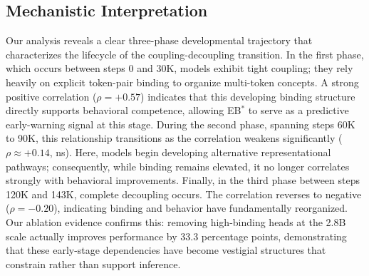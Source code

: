 \documentclass[10pt]{article} %
\begin{document}
\subsection{Mechanistic Interpretation}

Our analysis reveals a clear three-phase developmental trajectory that characterizes the lifecycle of the coupling-decoupling transition.
In the first phase, which occurs between steps 0 and 30K, models exhibit tight coupling; they rely heavily on explicit token-pair binding to organize multi-token concepts. A strong positive correlation ($\rho=+0.57$) indicates that this developing binding structure directly supports behavioral competence, allowing EB$^*$ to serve as a predictive early-warning signal at this stage.
During the second phase, spanning steps 60K to 90K, this relationship transitions as the correlation weakens significantly ($\rho\approx+0.14$, ns). Here, models begin developing alternative representational pathways; consequently, while binding remains elevated, it no longer correlates strongly with behavioral improvements. 
Finally, in the third phase between steps 120K and 143K, complete decoupling occurs. The correlation reverses to negative ($\rho=-0.20$), indicating binding and behavior have fundamentally reorganized. Our ablation evidence confirms this:  removing high-binding heads at the 2.8B scale actually improves performance by $33.3$ percentage points, demonstrating that these early-stage dependencies have become vestigial structures that constrain rather than support inference.
\end{document}
